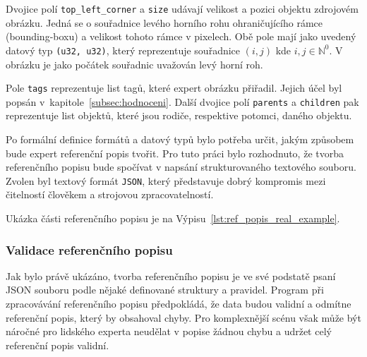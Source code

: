 Dvojice polí \texttt{top\_left\_corner} a \texttt{size} udávají velikost a pozici objektu zdrojovém obrázku.
Jedná se o souřadnice levého horního rohu ohraničujícího rámce (bounding-boxu) a velikost tohoto rámce v pixelech.
Obě pole mají jako uvedený datový typ \texttt{(u32, u32)}, který reprezentuje souřadnice $(i, j)$ kde $i,j \in \mathbb{N}^{0}$.
V obrázku je jako počátek souřadnic uvažován levý horní roh.

Pole \texttt{tags} reprezentuje list tagů, které expert obrázku přiřadil.
Jejich účel byl popsán v~kapitole~\ref{subsec:hodnoceni}.
Další dvojice polí \texttt{parents} a \texttt{children} pak reprezentuje list objektů, které jsou rodiče, respektive potomci, daného objektu.

Po formální definice formátů a datový typů bylo potřeba určit, jakým způsobem bude expert referenční popis tvořit.
Pro tuto práci bylo rozhodnuto, že tvorba referenčního popisu bude spočívat v napsání strukturovaného textového souboru.
Zvolen byl textový formát \texttt{JSON}, který představuje dobrý kompromis mezi čitelností člověkem a strojovou zpracovatelností.

Ukázka části referenčního popisu je na Výpisu~\ref{lst:ref_popis_real_example}.


\subsubsection{Validace referenčního popisu}
Jak bylo právě ukázáno, tvorba referenčního popisu je ve své podstatě psaní JSON souboru podle nějaké definované struktury a pravidel.
Program při zpracovávání referenčního popisu předpokládá, že data budou validní a odmítne referenční popis, který by obsahoval chyby.
Pro komplexnější scénu však může být náročné pro lidského experta neudělat v popise žádnou chybu a udržet celý referenční popis validní.

